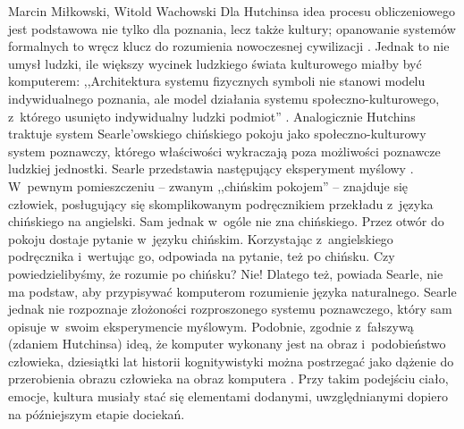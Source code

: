 \begin{artplenv2auth}{Marcin Miłkowski, Witold Wachowski}
Dla Hutchinsa idea procesu obliczeniowego jest podstawowa nie tylko dla poznania, lecz także kultury; opanowanie systemów formalnych to wręcz klucz do rozumienia nowoczesnej cywilizacji
\parencite[][s.~359–360]{hutchins_cognition_1995}. %
 Jednak to nie umysł ludzki, ile większy wycinek ludzkiego świata kulturowego miałby być komputerem: ,,Architektura systemu fizycznych symboli nie stanowi modelu indywidualnego poznania, ale model działania systemu społeczno-kulturowego, z~którego usunięto indywidualny ludzki podmiot'' 
\parencite[][s.~363]{hutchins_cognition_1995}. %
 Analogicznie Hutchins traktuje system Searle'owskiego chińskiego pokoju jako społeczno-kulturowy system poznawczy, którego właściwości wykraczają poza możliwości poznawcze ludzkiej jednostki. Searle przedstawia następujący eksperyment myślowy 
\parencite[][]{searle_umysly_1995}. %
 W~pewnym pomieszczeniu -- zwanym ,,chińskim pokojem'' -- znajduje się człowiek, posługujący się skomplikowanym podręcznikiem przekładu z~języka chińskiego na angielski. Sam jednak w~ogóle nie zna chińskiego. Przez otwór do pokoju dostaje pytanie w~języku chińskim. Korzystając z~angielskiego podręcznika i~wertując go, odpowiada na pytanie, też po chińsku. Czy powiedzielibyśmy, że rozumie po chińsku? Nie! Dlatego też, powiada Searle, nie ma podstaw, aby przypisywać komputerom rozumienie języka naturalnego. Searle jednak nie rozpoznaje złożoności rozproszonego systemu poznawczego, który sam opisuje w~swoim eksperymencie myślowym. Podobnie, zgodnie z~fałszywą (zdaniem Hutchinsa) ideą, że komputer wykonany jest na obraz i~podobieństwo człowieka, dziesiątki lat historii kognitywistyki można postrzegać jako dążenie do przerobienia obrazu człowieka na obraz komputera 
\parencite[][s.~361–363]{hutchins_cognition_1995}. %
 Przy takim podejściu ciało, emocje, kultura musiały stać się elementami dodanymi, uwzględnianymi dopiero na późniejszym etapie dociekań.


\end{artplenv2auth}
